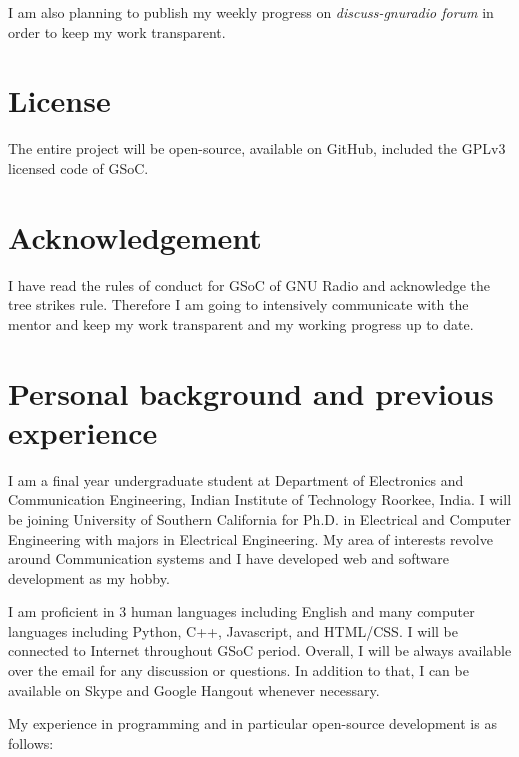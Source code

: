 \documentclass[a4paper, 11pt]{article}
\begin{document}
I am also planning to publish my weekly progress on \textit{discuss-gnuradio forum} in order to keep my work transparent.

\section{License}
The entire project will be open-source, available on GitHub, included the GPLv3 licensed code of GSoC.

\section{Acknowledgement}
I have read the rules of conduct for GSoC of GNU Radio and acknowledge the tree strikes rule. Therefore I am going to intensively communicate with the mentor and keep my work transparent and my working progress up to date.

\section{Personal background and previous experience}
I am a final year undergraduate student at Department of Electronics and Communication Engineering, Indian Institute of Technology Roorkee, India. I will be joining University of Southern California for Ph.D. in Electrical and Computer Engineering with majors in Electrical Engineering. My area of interests revolve around Communication systems and I have developed web and software development as my hobby.

I am proficient in 3 human languages including English and  many computer languages including Python, C++, Javascript, and HTML/CSS. I will be connected to Internet throughout GSoC period. Overall, I will be always available over the email for any discussion or questions. In addition to that, I can be available on Skype and Google Hangout whenever necessary.



My experience in programming and in particular open-source development is as follows:
\end{document}
